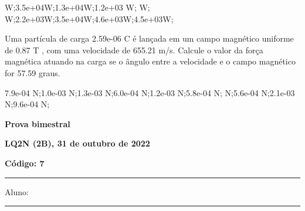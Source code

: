 \documentclass[12pt, addpoints]{exam}
\begin{document}
\begin{questions}
\begin{multicols*}{2}
\begin{oneparchoices}
 W;\choice 3.5e+04W;\choice 1.3e+04W;\choice 1.2e+03 W; W; W;\choice 2.2e+03W;\choice 3.5e+04W;\choice 4.6e+03W;\choice 4.5e+03W;\end{oneparchoices}
\question[20] Uma partícula de carga 2.59e-06 C é lançada em um campo magnético uniforme de    0.87 T , com uma velocidade de 655.21 m/s. Calcule o valor da força magnética atuando na carga se o ângulo entre a velocidade e o campo magnético for   57.59 graus.

\begin{oneparchoices}
\choice 7.9e-04 N;\choice 1.0e-03 N;\choice 1.3e-03 N;\choice 6.0e-04 N;\choice 1.2e-03 N;\choice 5.8e-04 N; N;\choice 5.6e-04 N;\choice 2.1e-03 N;\choice 9.6e-04 N;\end{oneparchoices}
\end{multicols*}
\end{questions}
\newpage
        \begin{minipage}[b]{0.75\linewidth}
            \begin{flushleft}
                {\bf \large Prova bimestral}
            \end{flushleft}
            \begin{flushleft}
                {\bf \large LQ2N (2B), 31 de outubro de 2022}
            \end{flushleft}
        \end{minipage}
        \begin{minipage}[b]{0.20\linewidth}
            \begin{flushright}
                {\bf \large Código: 7}
            \end{flushright}
        \end{minipage}
        \vspace{0.5cm} \hrule \vspace{0.5cm}
        \begin{minipage}{0.75\linewidth}
            Aluno:
        \end{minipage}
        \vspace{0.5cm} \hrule \vspace{0.5cm}
\end{document}
